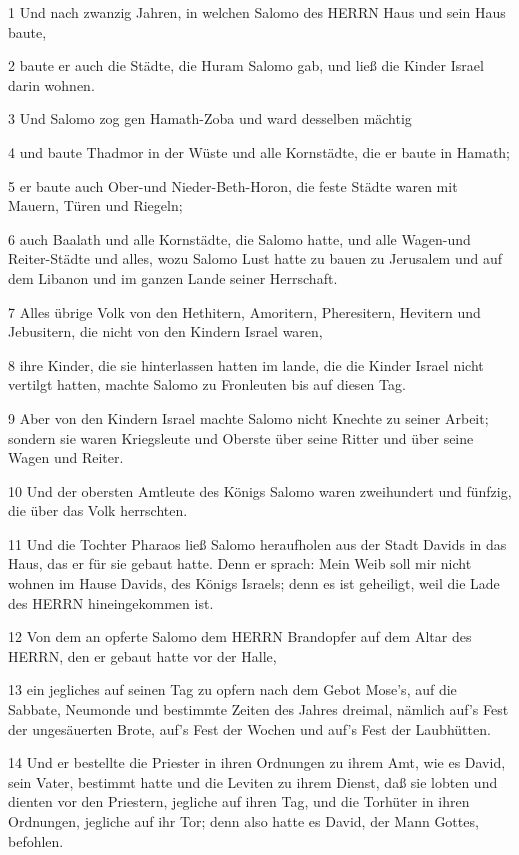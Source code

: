 \par 1 Und nach zwanzig Jahren, in welchen Salomo des HERRN Haus und sein Haus baute,
\par 2 baute er auch die Städte, die Huram Salomo gab, und ließ die Kinder Israel darin wohnen.
\par 3 Und Salomo zog gen Hamath-Zoba und ward desselben mächtig
\par 4 und baute Thadmor in der Wüste und alle Kornstädte, die er baute in Hamath;
\par 5 er baute auch Ober-und Nieder-Beth-Horon, die feste Städte waren mit Mauern, Türen und Riegeln;
\par 6 auch Baalath und alle Kornstädte, die Salomo hatte, und alle Wagen-und Reiter-Städte und alles, wozu Salomo Lust hatte zu bauen zu Jerusalem und auf dem Libanon und im ganzen Lande seiner Herrschaft.
\par 7 Alles übrige Volk von den Hethitern, Amoritern, Pheresitern, Hevitern und Jebusitern, die nicht von den Kindern Israel waren,
\par 8 ihre Kinder, die sie hinterlassen hatten im lande, die die Kinder Israel nicht vertilgt hatten, machte Salomo zu Fronleuten bis auf diesen Tag.
\par 9 Aber von den Kindern Israel machte Salomo nicht Knechte zu seiner Arbeit; sondern sie waren Kriegsleute und Oberste über seine Ritter und über seine Wagen und Reiter.
\par 10 Und der obersten Amtleute des Königs Salomo waren zweihundert und fünfzig, die über das Volk herrschten.
\par 11 Und die Tochter Pharaos ließ Salomo heraufholen aus der Stadt Davids in das Haus, das er für sie gebaut hatte. Denn er sprach: Mein Weib soll mir nicht wohnen im Hause Davids, des Königs Israels; denn es ist geheiligt, weil die Lade des HERRN hineingekommen ist.
\par 12 Von dem an opferte Salomo dem HERRN Brandopfer auf dem Altar des HERRN, den er gebaut hatte vor der Halle,
\par 13 ein jegliches auf seinen Tag zu opfern nach dem Gebot Mose's, auf die Sabbate, Neumonde und bestimmte Zeiten des Jahres dreimal, nämlich auf's Fest der ungesäuerten Brote, auf's Fest der Wochen und auf's Fest der Laubhütten.
\par 14 Und er bestellte die Priester in ihren Ordnungen zu ihrem Amt, wie es David, sein Vater, bestimmt hatte und die Leviten zu ihrem Dienst, daß sie lobten und dienten vor den Priestern, jegliche auf ihren Tag, und die Torhüter in ihren Ordnungen, jegliche auf ihr Tor; denn also hatte es David, der Mann Gottes, befohlen.
